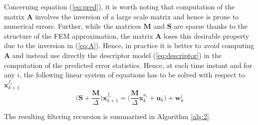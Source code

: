 \documentclass[journal]{IEEEtran}
\newcommand{\mb}{\mathbf}
\newcommand{\be}{\begin{equation}}
\newcommand{\ee}{\end{equation}}
\begin{document}
Concerning equation (\ref{eq:pred}), it is worth noting that computation of the matrix $\mb{A}$ involves the inversion of a large scale matrix and hence is prone to numerical errors.
Further, while the matrices $\mb{M}$ and $\mb{S}$ are sparse thanks to the structure of the FEM approximation, the matrix $\mb{A}$ loses this desirable property due to the inversion in
(\ref{eq:A}). Hence, in practice it is better to avoid computing $\mb{A}$ and instead use directly the descriptor model (\ref{eq:descriptor}) in the computation of the predicted error statistics.
Hence, at each time instant and for any $i$, the following linear system of equations has to be solved with respect to  $\mb{x}_{k+1}^{{f}_{i}} $
\be
\bigg(\mb{S} + \dfrac{\mb{M}}{\Delta}\bigg) \mb{x}_{k+1}^{{f}_{i}} = \bigg( \dfrac{\mb{M}}{\Delta}\mb{x}_{k}^{{a}_{i}} + \textbf{u}_{k}\bigg)  + \mb{w}_{k}^{i}
\ee


The resulting filtering recursion is summarized in Algorithm \ref{alg:2}.
\end{document}
